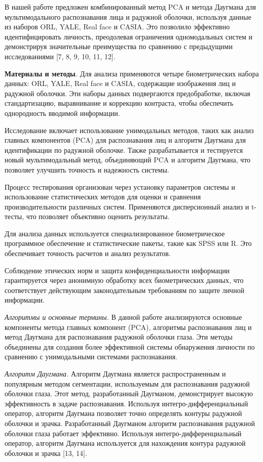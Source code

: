 В нашей работе предложен комбинированный метод PCA и метода Даугмана для
мультимодального распознавания лица и радужной оболочки, используя
данные из наборов ORL, YALE, Real face и CASIA. Это позволило эффективно
идентифицировать личность, преодолевая ограничения одномодальных систем
и демонстрируя значительные преимущества по сравнению с предыдущими
исследованиями {[}7, 8, 9, 10, 11, 12{]}.

{\bfseries Материалы и методы}\emph{.} Для анализа применяются четыре
биометрических набора данных: ORL, YALE, Real face и CASIA, содержащие
изображения лиц и радужной оболочки. Эти наборы данных подвергаются
предобработке, включая стандартизацию, выравнивание и коррекцию
контраста, чтобы обеспечить однородность вводимой информации.

Исследование включает использование унимодальных методов, таких как
анализ главных компонентов (PCA) для распознавания лиц и алгоритм
Даугмана для идентификации по радужной оболочке. Также разрабатывается и
тестируется новый мультимодальный метод, объединяющий PCA и алгоритм
Даугмана, что позволяет улучшить точность и надежность системы.

Процесс тестирования организован через установку параметров системы и
использование статистических методов для оценки и сравнения
производительности различных систем. Применяются дисперсионный анализ и
t-тесты, что позволяет объективно оценить результаты.

Для анализа данных используется специализированное биометрическое
программное обеспечение и статистические пакеты, такие как SPSS или R.
Это обеспечивает точность расчетов и анализ результатов.

Соблюдение этических норм и защита конфиденциальности информации
гарантируется через анонимную обработку всех биометрических данных, что
соответствует действующим законодательным требованиям по защите личной
информации.

\emph{Алгоритмы и основные термины.} В данной работе анализируются
основные компоненты метода главных компонент (PCA), алгоритмы
распознавания лиц и метод Даугмана для распознавания радужной оболочки
глаза. Эти методы объединены для создания более эффективной системы
обнаружения личности по сравнению с унимодальными системами
распознавания.

\emph{Алгоритм Даугмана.} Алгоритм Даугмана является распространенным и
популярным методом сегментации, используемым для распознавания радужной
оболочки глаза. Этот метод, разработанный Даугманом, демонстрирует
высокую эффективность в задаче распознавания. Используя
интегро-дифференциальный оператор, алгоритм Даугмана позволяет точно
определять контуры радужной оболочки и зрачка. Разработанный Даугманом
алгоритм распознавания радужной оболочки глаза работает эффективно.
Используя интегро-дифференциальный оператор, алгоритм Даугмана
используется для нахождения контура радужной оболочки и зрачка {[}13,
14{]}.

